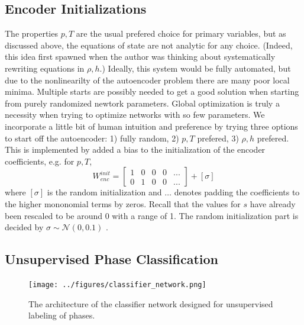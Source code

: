\documentclass[AMA,STIX1COL]{WileyNJD-v2}
\begin{document}
\hypertarget{header-n3312}{%
\subsection{Encoder Initializations}\label{header-n3312}}

The properties \(p,T\) are the usual prefered choice for primary
variables, but as discussed above, the equations of state are not
analytic for any choice. (Indeed, this idea first spawned when the
author was thinking about systematically rewriting equations in
\(\rho,h\).) Ideally, this system would be fully automated, but due to
the nonlinearilty of the autoencoder problem there are many poor local minima.
Multiple starts are possibly needed
to get a good solution when starting from purely randomized newtork
parameters. Global optimization is truly a necessity when trying to
optimize networks with so few parameters. We incorporate a little bit of
human intuition and preference by trying three options to start off the
autoencoder: 1) fully random, 2) \(p,T\) prefered, 3) \(\rho,h\)
prefered. This is implemented by added a bias to the initialization of
the encoder coefficients, e.g. for \(p,T\),
\begin{equation}
 W^{init}_{enc} = \left[\begin{array}{ccccc}
1 & 0 & 0 & 0 & ... \\
0 & 1 & 0 & 0 & ...
                        \end{array}\right]+[\sigma]
\end{equation}
where \([\sigma]\) is the random initialization and \(…\) denotes
padding the coefficients to the higher mononomial terms by zeros. Recall that the
values for \(s\) have already been rescaled to be around 0 with a range
of 1. The random initialization part is decided by
\(\sigma \sim \mathcal{N}(0,0.1)\) .

\hypertarget{header-n3317}{%
\subsection{Unsupervised Phase Classification}\label{header-n3317}}


\begin{figure}
\centering
\texttt{[image: ../figures/classifier\_network.png]}
\caption{\label{fig:classifyingnetwork}The architecture of the classifier network designed for
  unsupervised labeling of phases.}
\end{figure}
\end{document}
